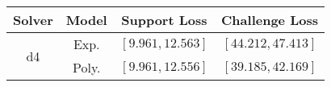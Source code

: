 \begin{tabular}{cc|c|c} 
\hline 
 Solver & Model & Support Loss  & Challenge Loss \tabularnewline\hline 
\hline 
\multirow{2}{*}{d4} & Exp. & $\left[9.961,12.563\right]$ & $\left[44.212,47.413\right]$ \tabularnewline 
 & Poly. & $\mathbf{\left[9.961,12.556\right]}$ & $\mathbf{\left[39.185,42.169\right]}$ \tabularnewline 
\hline 
\end{tabular} 


